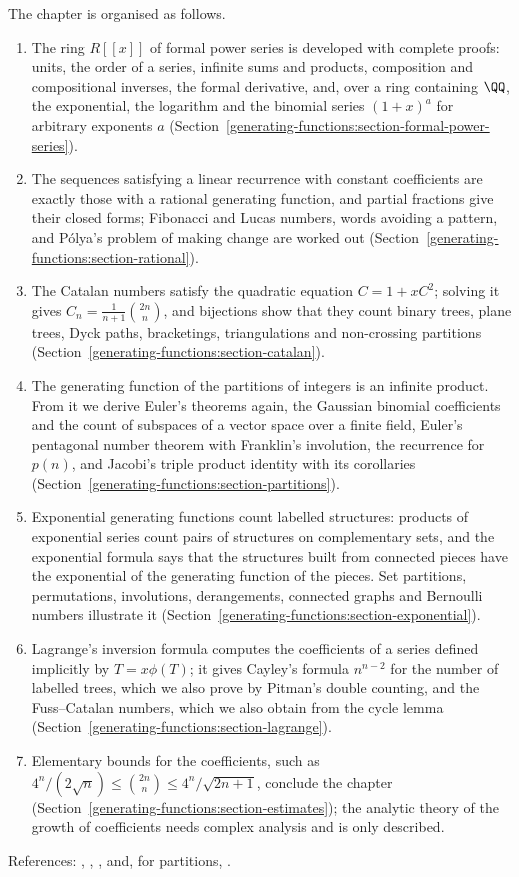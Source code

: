 The chapter is organised as follows.
\begin{enumerate}
\item The ring $R[[x]]$ of formal power series is developed with complete proofs: units, the order of a series, infinite sums and products, composition and compositional inverses, the formal
derivative, and, over a ring containing $\QQ$, the exponential, the logarithm and the binomial series $(1 + x)^a$ for arbitrary exponents $a$
(Section~\ref{generating-functions:section-formal-power-series}).
\item The sequences satisfying a linear recurrence with constant coefficients are exactly those with a rational generating function, and partial fractions give their closed forms; Fibonacci and
Lucas numbers, words avoiding a pattern, and P\'olya's problem of making change are worked out (Section~\ref{generating-functions:section-rational}).
\item The Catalan numbers satisfy the quadratic equation $C = 1 + xC^2$; solving it gives $C_n = \frac{1}{n + 1}\binom{2n}{n}$, and bijections show that they count binary trees, plane trees, Dyck
paths, bracketings, triangulations and non-crossing partitions (Section~\ref{generating-functions:section-catalan}).
\item The generating function of the partitions of integers is an infinite product. From it we derive Euler's theorems again, the Gaussian binomial coefficients and the count of subspaces of a vector
space over a finite field, Euler's pentagonal number theorem with Franklin's involution, the recurrence for $p(n)$, and Jacobi's triple product identity with its corollaries
(Section~\ref{generating-functions:section-partitions}).
\item Exponential generating functions count labelled structures: products of exponential series count pairs of structures on complementary sets, and the exponential formula says that the
structures built from connected pieces have the exponential of the generating function of the pieces. Set partitions, permutations, involutions, derangements, connected graphs and Bernoulli numbers
illustrate it (Section~\ref{generating-functions:section-exponential}).
\item Lagrange's inversion formula computes the coefficients of a series defined implicitly by $T = x\phi(T)$; it gives Cayley's formula $n^{n-2}$ for the number of labelled trees, which we also
prove by Pitman's double counting, and the Fuss--Catalan numbers, which we also obtain from the cycle lemma (Section~\ref{generating-functions:section-lagrange}).
\item Elementary bounds for the coefficients, such as $4^n/(2\sqrt{n}) \leq \binom{2n}{n} \leq 4^n/\sqrt{2n + 1}$, conclude the chapter (Section~\ref{generating-functions:section-estimates}); the analytic theory
of the growth of coefficients needs complex analysis and is only described.
\end{enumerate}
References: \cite{wilf-generatingfunctionology}, \cite{stanley-ec1}, \cite[Chapters 5 and 6]{stanley-ec2}, \cite{flajolet-sedgewick} and, for partitions, \cite{andrews-partitions}.

